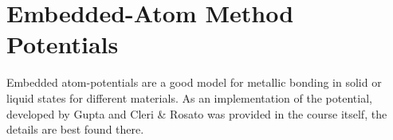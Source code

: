 \section{Embedded-Atom Method Potentials}
\begin{comment}
- describe Units 
- better discribed in the course
- good model for metalic systems
- work with gold clusters 

\end{comment}
Embedded atom-potentials are a good model for metallic bonding in solid or liquid states for different materials. As an implementation of the potential, developed by Gupta \cite{gupta} and Cleri \& Rosato \cite{rosato} was provided in the course \cite{molDymCourse} itself, the details are best found there.


